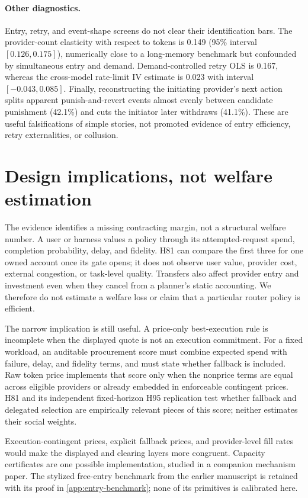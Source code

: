 \documentclass[11pt]{article}
\newcommand{\1}{\mathbf{1}}
\begin{document}
\paragraph{Other diagnostics.}
Entry, retry, and event-shape screens do not clear their identification bars.
The provider-count elasticity with respect to tokens is 0.149 (95\% interval
$[0.126,0.175]$), numerically close to a long-memory benchmark but confounded by
simultaneous entry and demand.  Demand-controlled retry OLS is 0.167, whereas the
cross-model rate-limit IV estimate is 0.023 with interval $[-0.043,0.085]$.
Finally, reconstructing the initiating provider's next action splits apparent
punish-and-revert events almost evenly between candidate punishment (42.1\%) and
cuts the initiator later withdraws (41.1\%).  These are useful falsifications of
simple stories, not promoted evidence of entry efficiency, retry externalities,
or collusion.

\section{Design implications, not welfare estimation}
\label{sec:welfare}

The evidence identifies a missing contracting margin, not a structural welfare
number.  A user or harness values a policy through its attempted-request spend,
completion probability, delay, and fidelity.  H81 can compare the first three for
one owned account once its gate opens; it does not observe user value, provider
cost, external congestion, or task-level quality.  Transfers also affect provider
entry and investment even when they cancel from a planner's static accounting.
We therefore do not estimate a welfare loss or claim that a particular router
policy is efficient.

The narrow implication is still useful.  A price-only best-execution rule is
incomplete when the displayed quote is not an execution commitment.  For a fixed
workload, an auditable procurement score must combine expected spend with failure,
delay, and fidelity terms, and must state whether fallback is included.  Raw token
price implements that score only when the nonprice terms are equal across eligible
providers or already embedded in enforceable contingent prices.  H81 and its
independent fixed-horizon H95 replication test whether fallback and delegated
selection are empirically relevant pieces of this score; neither estimates their
social weights.

Execution-contingent prices, explicit fallback prices, and provider-level fill
rates would make the displayed and clearing layers more congruent.  Capacity
certificates are one possible implementation, studied in a companion mechanism
paper.  The stylized free-entry benchmark from the earlier manuscript is retained
with its proof in \cref{app:entry-benchmark}; none of its primitives is calibrated
here.
\end{document}

